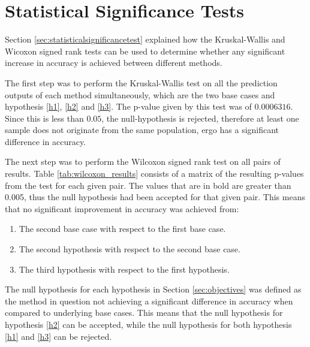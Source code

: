 \documentclass{UoYCSproject}
\begin{document}
\section{Statistical Significance Tests}
Section \ref{sec:statisticalsignificancetest} explained how the Kruskal-Wallis and Wicoxon signed rank tests can be used to determine whether any significant increase in accuracy is achieved between different methods. 

The first step was to perform the Kruskal-Wallis test on all the prediction outputs of each method simultaneously, which are the two base cases and hypothesis \ref{h1}, \ref{h2} and \ref{h3}. The p-value given by this test was of \textbf{$0.0006316$}. Since this is less than $0.05$, the null-hypothesis is rejected, therefore at least one sample does not originate from the same population, ergo has a significant difference in accuracy.

The next step was to perform the Wilcoxon signed rank test on all pairs of results. Table \ref{tab:wilcoxon_results} consists of a matrix of the resulting p-values from the test for each given pair. The values that are in bold are greater than 0.005, thus the null hypothesis had been accepted for that given pair. This means that no significant improvement in accuracy was achieved from:
\begin{enumerate}
    \item The second base case with respect to the first base case.
    \item The second hypothesis with respect to the second base case.
    \item The third hypothesis with respect to the first hypothesis.
\end{enumerate}

The null hypothesis for each hypothesis in Section \ref{sec:objectives} was defined as the method in question not achieving a significant difference in accuracy when compared to  underlying base cases. This means that the null hypothesis for hypothesis \ref{h2} can be accepted, while the null hypothesis for both hypothesis \ref{h1} and \ref{h3} can be rejected.
\end{document}
